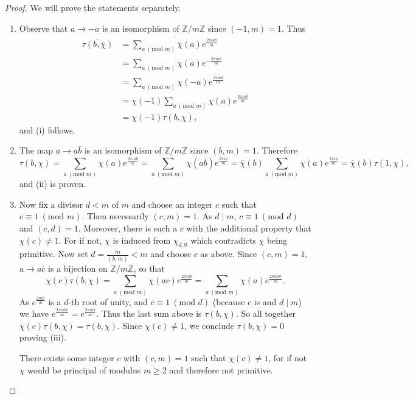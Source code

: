 \documentclass[12pt]{book}
\theoremstyle{definition}\newframedtheorem{method}{Method}
\newcommand{\tmod}[1]{\ \left(\text{mod }#1\right)}
\newcommand{\Z}{\mathbb{Z}}
\newcommand{\<}{\langle}
\renewcommand{\>}{\rangle}
\newcommand{\conj}{\overline}
\newcommand{\cchi}{\conj{\chi}}
\begin{document}
      \begin{proof}
        We will prove the statements separately.
        \begin{enumerate}[label=(\roman*)]
          \item Observe that $a \to -a$ is an isomorphism of $\Z/m\Z$ since $(-1,m) = 1$. Thus
          \begin{align*}
            \conj{\tau(b,\cchi)} &= \conj{\sum_{a \tmod{m}}\cchi(a)e^{\frac{2\pi iab}{m}}} \\
            &= \sum_{a \tmod{m}}\chi(a)e^{-\frac{2\pi iab}{m}} \\
            &= \sum_{a \tmod{m}}\chi(-a)e^{\frac{2\pi iab}{m}} \\
            &= \chi(-1)\sum_{a \tmod{m}}\chi(a)e^{\frac{2\pi iab}{m}} \\
            &= \chi(-1)\tau(b,\chi),
          \end{align*}
          and (i) follows.
          \item The map $a \to a\conj{b}$ is an isomorphism of $\Z/m\Z$ since $(b,m) = 1$. Therefore
          \[
            \tau(b,\chi) = \sum_{a \tmod{m}}\chi(a)e^{\frac{2\pi iab}{m}} = \sum_{a \tmod{m}}\chi(a\conj{b})e^{\frac{2\pi ia}{m}} = \cchi(b)\sum_{a \tmod{m}}\chi(a)e^{\frac{2\pi ia}{m}} = \cchi(b)\tau(1,\chi),
          \]
          and (ii) is proven.
          \item Now fix a divisor $d < m$ of $m$ and choose an integer $c$ such that $c \equiv 1 \tmod{m}$. Then necessarily $(c,m) = 1$. As $d \mid m$, $c \equiv 1 \tmod{d}$ and $(c,d) = 1$. Moreover, there is such a $c$ with the additional property that $\chi(c) \neq 1$. For if not, $\chi$ is induced from $\chi_{d,0}$ which contradicts $\chi$ being primitive. Now set $d = \frac{m}{(b,m)} < m$ and choose $c$ as above. Since $(c,m) = 1$, $a \to a\conj{c}$ is a bijection on $\Z/m\Z$, so that
          \[
            \chi(c)\tau(b,\chi) = \sum_{a \tmod{m}}\chi(ac)e^{\frac{2\pi iab}{m}} = \sum_{a \tmod{m}}\chi(a)e^{\frac{2\pi iab\conj{c}}{m}}.
          \]
          As $e^{\frac{2\pi ib}{m}}$ is a $d$-th root of unity, and $\conj{c} \equiv 1 \tmod{d}$ (because $c$ is and $d \mid m$) we have $e^{\frac{2\pi iab\conj{c}}{m}} = e^{\frac{2\pi iab}{m}}$. Thus the last sum above is $\tau(b,\chi)$. So all together $\chi(c)\tau(b,\chi) = \tau(b,\chi)$. Since $\chi(c) \neq 1$, we conclude $\tau(b,\chi) = 0$ proving (iii).

          There exists some integer $c$ with $(c,m) = 1$ such that $\chi(c) \neq 1$, for if not $\chi$ would be principal of modulus $m \ge 2$ and therefore not primitive.



\end{enumerate}
\end{proof}
\end{document}
